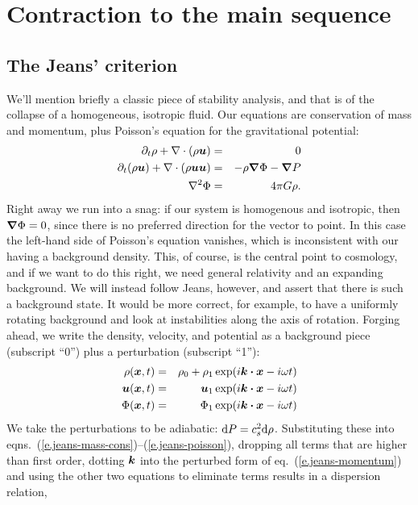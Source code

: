 \chapter{Contraction to the main sequence}

\section{The Jeans' criterion}

We'll mention briefly a classic piece of stability analysis, and that is of the collapse of a homogeneous, isotropic fluid. Our equations are conservation of mass and momentum, plus Poisson's equation for the gravitational potential:
\begin{eqnarray}
\partial_{t}\rho + \nabla \cdot(\rho \boldsymbol{u}) &=& 0\label{e.jeans-mass-cons}\\
\partial_{t}(\rho\boldsymbol{u}) + \nabla \cdot(\rho\boldsymbol{u}\boldsymbol{u}) &=& - \rho \boldsymbol{\nabla}\Phi - \boldsymbol{\nabla} P\label{e.jeans-momentum}\\
\nabla^{2} \Phi &=& 4\pi G \rho\label{e.jeans-poisson}.
\end{eqnarray}
Right away we run into a snag: if our system is homogenous and isotropic, then $\boldsymbol{\nabla}\Phi = 0$, since there is no preferred direction for the vector to point. In this case the left-hand side of Poisson's equation vanishes, which is inconsistent with our having a background density.  This, of course, is the central point to cosmology, and if we want to do this right, we need general relativity and an expanding background.  We will instead follow Jeans, however, and assert that there is such a background state. It would be more correct, for example, to have a uniformly rotating background and look at instabilities along the axis of rotation.  Forging ahead, we write the density, velocity, and potential as a background piece (subscript ``0'') plus a perturbation (subscript ``1''):
\begin{eqnarray*}
\rho(\boldsymbol{x},t) &=& \rho_{0} + \rho_{1}\exp(i\boldsymbol{k}\boldsymbol{\cdot}\boldsymbol{x} - i\omega t)\\
\boldsymbol{u}(\boldsymbol{x},t) &=& \boldsymbol{u}_{1}\exp(i\boldsymbol{k}\boldsymbol{\cdot}\boldsymbol{x} - i\omega t)\\
\Phi(\boldsymbol{x},t) &=& \Phi_{1}\exp(i\boldsymbol{k}\boldsymbol{\cdot}\boldsymbol{x} - i\omega t)
\end{eqnarray*}
We take the perturbations to be adiabatic: $\mathrm{d} P = c_{s}^{2}\mathrm{d}\rho$. Substituting these into eqns.~(\ref{e.jeans-mass-cons})--(\ref{e.jeans-poisson}), dropping all terms that are higher than first order, dotting $\boldsymbol{k}$ into the perturbed form of eq.~(\ref{e.jeans-momentum}) and using the other two equations to eliminate terms results in a dispersion relation,
